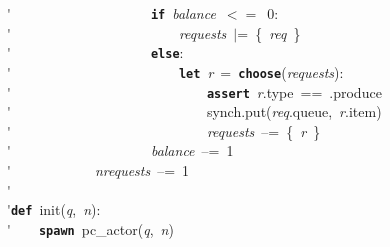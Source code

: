 \'\>~~~~~~~~~~~~~~~~~~~~\texttt{\textbf{if}}~\textit{balance}~$<=$~0:\\

\'\>~~~~~~~~~~~~~~~~~~~~~~~~\textit{requests}~$\vert$=~\{~\textit{req}~\}\\

\'\>~~~~~~~~~~~~~~~~~~~~\texttt{\textbf{else}}:\\

\'\>~~~~~~~~~~~~~~~~~~~~~~~~\texttt{\textbf{let}}~\textit{r}~=~\texttt{\textbf{choose}}(\textit{requests}):\\

\'\>~~~~~~~~~~~~~~~~~~~~~~~~~~~~\texttt{\textbf{assert}}~\textit{r}.type~==~.produce\\

\'\>~~~~~~~~~~~~~~~~~~~~~~~~~~~~synch.put(\textit{req}.queue,~\textit{r}.item)\\

\'\>~~~~~~~~~~~~~~~~~~~~~~~~~~~~\textit{requests}~--=~\{~\textit{r}~\}\\

\'\>~~~~~~~~~~~~~~~~~~~~\textit{balance}~--=~1\\

\'\>~~~~~~~~~~~~\textit{nrequests}~--=~1\\

\'\>\\

\'\>\texttt{\textbf{def}}~init(\textit{q},~\textit{n}):\\

\'\>~~~~\texttt{\textbf{spawn}}~pc\_actor(\textit{q},~\textit{n})